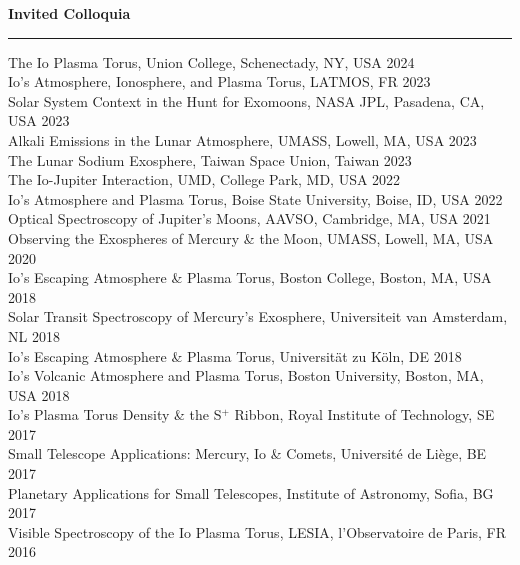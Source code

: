 \documentclass[12pt]{report}
\begin{document}
\vspace{2 mm}
\noindent\bf{Invited Colloquia}\rm \hspace*{\fill} \\
\rule{\textwidth}{1pt}
\noindent The Io Plasma Torus, Union College, Schenectady, NY, USA \hfill 2024\\
\noindent Io's Atmosphere, Ionosphere, and Plasma Torus, LATMOS, FR \hfill 2023\\
\noindent Solar System Context in the Hunt for Exomoons, NASA JPL, Pasadena, CA, USA \hfill 2023\\
\noindent Alkali Emissions in the Lunar Atmosphere, UMASS, Lowell, MA, USA \hfill 2023\\
\noindent The Lunar Sodium Exosphere, Taiwan Space Union, Taiwan \hfill 2023\\
\noindent The Io-Jupiter Interaction, UMD, College Park, MD, USA \hfill 2022\\
\noindent Io's Atmosphere and Plasma Torus, Boise State University, Boise, ID, USA \hfill 2022\\
\noindent Optical Spectroscopy of Jupiter's Moons, AAVSO, Cambridge, MA, USA \hfill 2021\\
\noindent Observing the Exospheres of Mercury \& the Moon, UMASS, Lowell, MA, USA \hfill 2020\\
\noindent Io's Escaping Atmosphere \& Plasma Torus, Boston College, Boston, MA, USA \hfill 2018\\
\noindent Solar Transit Spectroscopy of Mercury's Exosphere, Universiteit van Amsterdam, NL \hfill 2018\\
\noindent Io's Escaping Atmosphere \& Plasma Torus, Universit\"at zu K\"oln, DE \hfill 2018\\
\noindent Io's Volcanic Atmosphere and Plasma Torus, Boston University, Boston, MA, USA \hfill 2018\\
\noindent Io's Plasma Torus Density \& the S$^+$ Ribbon, Royal Institute of Technology, SE \hfill 2017\\
\noindent Small Telescope Applications: Mercury, Io \& Comets, Universit\'e de Li\`ege, BE \hfill 2017\\
\noindent Planetary Applications for Small Telescopes, Institute of Astronomy, Sofia, BG \hfill 2017\\
\noindent Visible Spectroscopy of the Io Plasma Torus, LESIA, l'Observatoire de Paris, FR \hfill 2016\\
\end{document}
